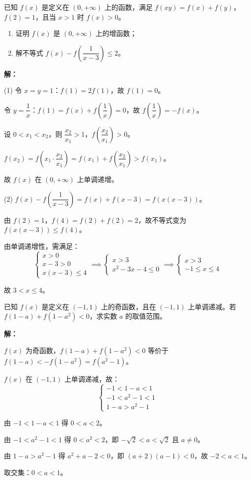 \documentclass[12pt,a4paper]{ctexart}
\begin{document}
\begin{examplebox}[例7]
已知 $f(x)$ 是定义在 $(0,+\infty)$ 上的函数，满足 $f(xy)=f(x)+f(y)$，$f(2)=1$，且当 $x>1$ 时 $f(x)>0$。
\begin{enumerate}[label=(\arabic*)]
  \item 证明 $f(x)$ 是 $(0,+\infty)$ 上的增函数；
  \item 解不等式 $f(x)-f\!\left(\dfrac{1}{x-3}\right)\le2$。
\end{enumerate}

\medskip
\textbf{解：}

(1) 令 $x=y=1$：$f(1)=2f(1)$，故 $f(1)=0$。

令 $y=\dfrac{1}{x}$：$f(1)=f(x)+f\!\left(\dfrac{1}{x}\right)=0$，故 $f\!\left(\dfrac{1}{x}\right)=-f(x)$。

设 $0<x_1<x_2$，则 $\dfrac{x_2}{x_1}>1$，$f\!\left(\dfrac{x_2}{x_1}\right)>0$。

$f(x_2)=f\!\left(x_1\cdot\dfrac{x_2}{x_1}\right)=f(x_1)+f\!\left(\dfrac{x_2}{x_1}\right)>f(x_1)$。

故 $f(x)$ 在 $(0,+\infty)$ 上单调递增。

(2) $f(x)-f\!\left(\dfrac{1}{x-3}\right)=f(x)+f(x-3)=f(x(x-3))$。

由 $f(2)=1$，$f(4)=f(2)+f(2)=2$，故不等式变为 $f(x(x-3))\le f(4)$。

由单调递增性，需满足：
\[\begin{cases} x>0 \\ x-3>0 \\ x(x-3)\le4 \end{cases}\implies\begin{cases} x>3 \\ x^2-3x-4\le0 \end{cases}\implies\begin{cases} x>3 \\ -1\le x\le4 \end{cases}\]

故 $\boxed{3<x\le4}$。
\end{examplebox}

\begin{examplebox}[例8]
已知 $f(x)$ 是定义在 $(-1,1)$ 上的奇函数，且在 $(-1,1)$ 上单调递减。若 $f(1-a)+f(1-a^2)<0$，求实数 $a$ 的取值范围。

\medskip
\textbf{解：}

$f(x)$ 为奇函数，$f(1-a)+f(1-a^2)<0$ 等价于 $f(1-a)<-f(1-a^2)=f(a^2-1)$。

$f(x)$ 在 $(-1,1)$ 上单调递减，故：
\[\begin{cases} -1<1-a<1 \\ -1<a^2-1<1 \\ 1-a>a^2-1 \end{cases}\]

由 $-1<1-a<1$ 得 $0<a<2$。

由 $-1<a^2-1<1$ 得 $0<a^2<2$，即 $-\sqrt{2}<a<\sqrt{2}$ 且 $a\ne0$。

由 $1-a>a^2-1$ 得 $a^2+a-2<0$，即 $(a+2)(a-1)<0$，故 $-2<a<1$。

取交集：$\boxed{0<a<1}$。
\end{examplebox}
\end{document}
